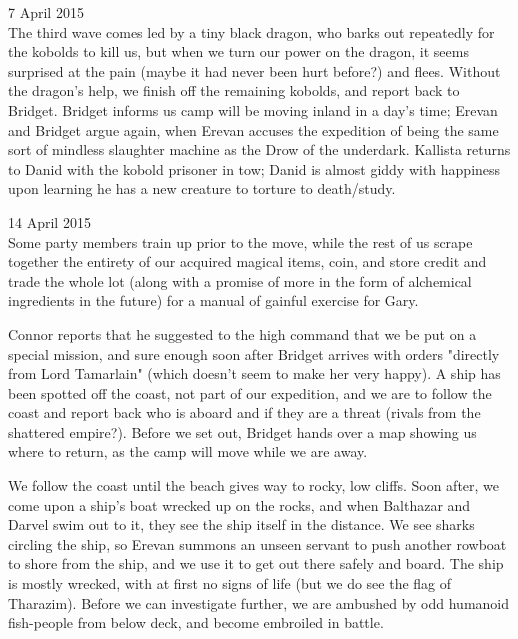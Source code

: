 \documentclass[letterpaper]{article}
\begin{document}
7 April 2015 \\
The third wave comes led by a tiny black dragon, who barks out repeatedly for the kobolds to kill us, but when we turn our power on the dragon, it seems surprised at the pain (maybe it had never been hurt before?) and flees. Without the dragon's help, we finish off the remaining kobolds, and report back to Bridget. Bridget informs us camp will be moving inland in a day's time; Erevan and Bridget argue again, when Erevan accuses the expedition of being the same sort of mindless slaughter machine as the Drow of the underdark. Kallista returns to Danid with the kobold prisoner in tow; Danid is almost giddy with happiness upon learning he has a new creature to torture to death/study.

14 April 2015 \\
Some party members train up prior to the move, while the rest of us scrape together the entirety of our acquired magical items, coin, and store credit and trade the whole lot (along with a promise of more in the form of alchemical ingredients in the future) for a manual of gainful exercise for Gary. 

Connor reports that he suggested to the high command that we be put on a special mission, and sure enough soon after Bridget arrives with orders "directly from Lord Tamarlain" (which doesn't seem to make her very happy). A ship has been spotted off the coast, not part of our expedition, and we are to follow the coast and report back who is aboard and if they are a threat (rivals from the shattered empire?). Before we set out, Bridget hands over a map showing us where to return, as the camp will move while we are away.

We follow the coast until the beach gives way to rocky, low cliffs. Soon after, we come upon a ship's boat wrecked up on the rocks, and when Balthazar and Darvel swim out to it, they see the ship itself in the distance. We see sharks circling the ship, so Erevan summons an unseen servant to push another rowboat to shore from the ship, and we use it to get out there safely and board. The ship is mostly wrecked, with at first no signs of life (but we do see the flag of Tharazim). Before we can investigate further, we are ambushed by odd humanoid fish-people from below deck, and become embroiled in battle.
\end{document}
